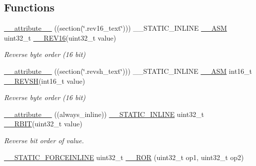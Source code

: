 \subsection*{Functions}
\begin{DoxyCompactItemize}
\item 
\mbox{\hyperlink{group___c_m_s_i_s___core___instruction_interface_gae84a2733711339c5eefeb0d899506b96}{\+\_\+\+\_\+attribute\+\_\+\+\_\+}} ((section(\char`\"{}.rev16\+\_\+text\char`\"{}))) \+\_\+\+\_\+\+S\+T\+A\+T\+I\+C\+\_\+\+I\+N\+L\+I\+NE \mbox{\hyperlink{cmsis__iccarm_8h_a1378040bcf22428955c6e3ce9c2053cd}{\+\_\+\+\_\+\+A\+SM}} uint32\+\_\+t \mbox{\hyperlink{group___c_m_s_i_s___core___instruction_interface_gaa12aedd096506c9639c1581acd5c6a78}{\+\_\+\+\_\+\+R\+E\+V16}}(uint32\+\_\+t value)
\begin{DoxyCompactList}\small\item\em Reverse byte order (16 bit) \end{DoxyCompactList}\item 
\mbox{\hyperlink{group___c_m_s_i_s___core___instruction_interface_gabe2b619a40cc0a7ffa8f765249ccf682}{\+\_\+\+\_\+attribute\+\_\+\+\_\+}} ((section(\char`\"{}.revsh\+\_\+text\char`\"{}))) \+\_\+\+\_\+\+S\+T\+A\+T\+I\+C\+\_\+\+I\+N\+L\+I\+NE \mbox{\hyperlink{cmsis__iccarm_8h_a1378040bcf22428955c6e3ce9c2053cd}{\+\_\+\+\_\+\+A\+SM}} int16\+\_\+t \mbox{\hyperlink{group___c_m_s_i_s___core___instruction_interface_gacb695341318226a5f69ed508166622ac}{\+\_\+\+\_\+\+R\+E\+V\+SH}}(int16\+\_\+t value)
\begin{DoxyCompactList}\small\item\em Reverse byte order (16 bit) \end{DoxyCompactList}\item 
\mbox{\hyperlink{group___c_m_s_i_s___core___instruction_interface_gab926fe7178a379c3a7c0410b06fcb661}{\+\_\+\+\_\+attribute\+\_\+\+\_\+}} ((always\+\_\+inline)) \mbox{\hyperlink{cmsis__iccarm_8h_aba87361bfad2ae52cfe2f40c1a1dbf9c}{\+\_\+\+\_\+\+S\+T\+A\+T\+I\+C\+\_\+\+I\+N\+L\+I\+NE}} uint32\+\_\+t \mbox{\hyperlink{group___c_m_s_i_s___core___instruction_interface_gaf944a7b7d8fd70164cca27669316bcf7}{\+\_\+\+\_\+\+R\+B\+IT}}(uint32\+\_\+t value)
\begin{DoxyCompactList}\small\item\em Reverse bit order of value. \end{DoxyCompactList}\item 
\mbox{\hyperlink{cmsis__iccarm_8h_ab904513442afdf77d4f8c74f23cbb040}{\+\_\+\+\_\+\+S\+T\+A\+T\+I\+C\+\_\+\+F\+O\+R\+C\+E\+I\+N\+L\+I\+NE}} uint32\+\_\+t \mbox{\hyperlink{group___c_m_s_i_s___core___instruction_interface_gab16acb6456176f1e87a4f2724c2b6028}{\+\_\+\+\_\+\+R\+OR}} (uint32\+\_\+t op1, uint32\+\_\+t op2)

\end{DoxyCompactItemize}
